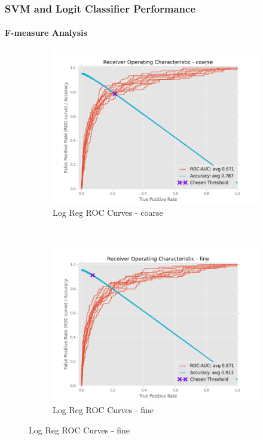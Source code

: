 \documentclass{beamer}
\begin{document}
\begin{frame}
    \frametitle{SVM and Logit Classifier Performance}  %
    \framesubtitle{F-measure Analysis}
    \begin{figure}[!htb]
        \centering
        \begin{subfigure}[t]{0.475\textwidth}
            \centering
            \includegraphics[width=\textwidth]{fig/LogReg_FindThreshold_RocCurve_coarse}
            \caption{Log Reg ROC Curves - coarse}
        \end{subfigure}%
        ~
        \begin{subfigure}[t]{0.475\textwidth}
            \centering
            \includegraphics[width=\textwidth]{fig/LogReg_FindThreshold_RocCurve_fine}
            \caption{Log Reg ROC Curves - fine}
        \end{subfigure}
        \label{fig:LogRegThreshAcc}
    \end{figure}
\end{frame}
\end{document}
